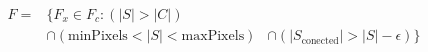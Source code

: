 \begin{equation}
\begin{aligned}
F ={} & \{F_{x} \in  F_{c} : (|S| > |C|) \\
      & \cap (\mathrm{minPixels}  < |S| < \mathrm{maxPixels}) 
      & \cap (|S_{\mathrm{conected}}| > |S| - \epsilon)\}
\end{aligned}
\end{equation}